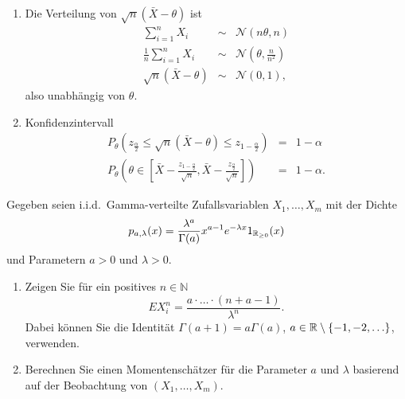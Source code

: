 \solution
\begin{enumerate}

    \item Die Verteilung von $\sqrt{n} \left( \bar X -\theta \right)$ ist
        \begin{eqnarray*}
            \sum_{i=1}^{n} X_i &\sim& \mathcal N \left( n\theta, n \right) \\
            \frac{1}{n} \sum_{i=1}^{n} X_i &\sim& \mathcal N \left( \theta, \frac{ n}{n^2} \right) \\
            \sqrt{n}\left( \bar X -\theta \right) & \sim & \mathcal N \left( 0, 1 \right),
        \end{eqnarray*}
        also unabhängig von $\theta$.
    \item Konfidenzintervall
        \begin{eqnarray*}
            P_\theta \left( z_{\frac{\alpha}{2}} \leq \sqrt{n}\left( \bar X -\theta \right) \leq z_{1-\frac{\alpha}{2}}  \right) &=&  1-\alpha \\
            P_\theta \left( \theta\in \left[ \bar X - \frac{z_{1-\frac{\alpha}{2}}}{\sqrt{n}}, \bar X - \frac{z_{\frac{\alpha}{2}}}{\sqrt{n}} \right] \right) &=&  1-\alpha.
        \end{eqnarray*}

\end{enumerate}



Gegeben seien i.i.d.\ Gamma-verteilte Zufallsvariablen $X_1,\ldots,X_m$ mit der Dichte
\begin{equation*}
    p_{a,\lambda}(x) = \frac{\lambda^a}{\Gamma(a)}x^{a-1}e^{-\lambda x} 1_{\mathbb R_{\geq 0}}(x)
\end{equation*}
und Parametern $a>0$ und $\lambda>0$.
\begin{enumerate}
    \item Zeigen Sie für ein positives $n\in\mathbb N$
        \begin{equation*}
            E X_i^n = \frac{a\cdot\ldots\cdot (n+a-1)}{\lambda^n}.
        \end{equation*}
        Dabei können Sie die Identität 
        $\Gamma(a+1)=a \Gamma(a)$, $a\in\mathbb R \setminus \left\{ -1,-2,\ldots \right\}$, verwenden.
    \item Berechnen Sie einen Momentenschätzer für die Parameter $a$ und $\lambda$ basierend auf
        der Beobachtung von $\left( X_1,\ldots,X_m \right)$. 
\end{enumerate}

